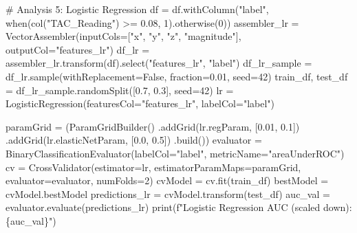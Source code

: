 \documentclass[
  letterpaper,
  DIV=11,
  numbers=noendperiod]{scrartcl}
\newenvironment{Shaded}{\begin{snugshade}}{\end{snugshade}}
\newcommand{\BuiltInTok}[1]{\textcolor[rgb]{0.98,0.46,0.51}{#1}}
\newcommand{\CommentTok}[1]{\textcolor[rgb]{0.42,0.45,0.49}{#1}}
\newcommand{\DecValTok}[1]{\textcolor[rgb]{0.47,0.72,1.00}{#1}}
\newcommand{\FloatTok}[1]{\textcolor[rgb]{0.47,0.72,1.00}{#1}}
\newcommand{\NormalTok}[1]{\textcolor[rgb]{0.88,0.89,0.91}{#1}}
\newcommand{\OperatorTok}[1]{\textcolor[rgb]{0.88,0.89,0.91}{#1}}
\newcommand{\SpecialCharTok}[1]{\textcolor[rgb]{0.47,0.72,1.00}{#1}}
\newcommand{\SpecialStringTok}[1]{\textcolor[rgb]{0.62,0.80,1.00}{#1}}
\newcommand{\StringTok}[1]{\textcolor[rgb]{0.62,0.80,1.00}{#1}}
\newcommand{\VariableTok}[1]{\textcolor[rgb]{1.00,0.67,0.44}{#1}}
\begin{document}
\begin{Shaded}
\begin{Highlighting}[]
    \CommentTok{\# Analysis 5: Logistic Regression}
\NormalTok{    df }\OperatorTok{=}\NormalTok{ df.withColumn(}\StringTok{"label"}\NormalTok{, when(col(}\StringTok{"TAC\_Reading"}\NormalTok{) }\OperatorTok{\textgreater{}=} \FloatTok{0.08}\NormalTok{, }\DecValTok{1}\NormalTok{).otherwise(}\DecValTok{0}\NormalTok{))}
\NormalTok{    assembler\_lr }\OperatorTok{=}\NormalTok{ VectorAssembler(inputCols}\OperatorTok{=}\NormalTok{[}\StringTok{"x"}\NormalTok{, }\StringTok{"y"}\NormalTok{, }\StringTok{"z"}\NormalTok{, }\StringTok{"magnitude"}\NormalTok{], outputCol}\OperatorTok{=}\StringTok{"features\_lr"}\NormalTok{)}
\NormalTok{    df\_lr }\OperatorTok{=}\NormalTok{ assembler\_lr.transform(df).select(}\StringTok{"features\_lr"}\NormalTok{, }\StringTok{"label"}\NormalTok{)}
\NormalTok{    df\_lr\_sample }\OperatorTok{=}\NormalTok{ df\_lr.sample(withReplacement}\OperatorTok{=}\VariableTok{False}\NormalTok{, fraction}\OperatorTok{=}\FloatTok{0.01}\NormalTok{, seed}\OperatorTok{=}\DecValTok{42}\NormalTok{)}
\NormalTok{    train\_df, test\_df }\OperatorTok{=}\NormalTok{ df\_lr\_sample.randomSplit([}\FloatTok{0.7}\NormalTok{, }\FloatTok{0.3}\NormalTok{], seed}\OperatorTok{=}\DecValTok{42}\NormalTok{)}
\NormalTok{    lr }\OperatorTok{=}\NormalTok{ LogisticRegression(featuresCol}\OperatorTok{=}\StringTok{"features\_lr"}\NormalTok{, labelCol}\OperatorTok{=}\StringTok{"label"}\NormalTok{)}

\NormalTok{    paramGrid }\OperatorTok{=}\NormalTok{ (ParamGridBuilder()}
\NormalTok{                 .addGrid(lr.regParam, [}\FloatTok{0.01}\NormalTok{, }\FloatTok{0.1}\NormalTok{])}
\NormalTok{                 .addGrid(lr.elasticNetParam, [}\FloatTok{0.0}\NormalTok{, }\FloatTok{0.5}\NormalTok{])}
\NormalTok{                 .build())}
\NormalTok{    evaluator }\OperatorTok{=}\NormalTok{ BinaryClassificationEvaluator(labelCol}\OperatorTok{=}\StringTok{"label"}\NormalTok{, metricName}\OperatorTok{=}\StringTok{"areaUnderROC"}\NormalTok{)}
\NormalTok{    cv }\OperatorTok{=}\NormalTok{ CrossValidator(estimator}\OperatorTok{=}\NormalTok{lr, estimatorParamMaps}\OperatorTok{=}\NormalTok{paramGrid, evaluator}\OperatorTok{=}\NormalTok{evaluator, numFolds}\OperatorTok{=}\DecValTok{2}\NormalTok{)}
\NormalTok{    cvModel }\OperatorTok{=}\NormalTok{ cv.fit(train\_df)}
\NormalTok{    bestModel }\OperatorTok{=}\NormalTok{ cvModel.bestModel}
\NormalTok{    predictions\_lr }\OperatorTok{=}\NormalTok{ cvModel.transform(test\_df)}
\NormalTok{    auc\_val }\OperatorTok{=}\NormalTok{ evaluator.evaluate(predictions\_lr)}
    \BuiltInTok{print}\NormalTok{(}\SpecialStringTok{f"Logistic Regression AUC (scaled down): }\SpecialCharTok{\{}\NormalTok{auc\_val}\SpecialCharTok{\}}\SpecialStringTok{"}\NormalTok{)}


\end{Highlighting}
\end{Shaded}
\end{document}
